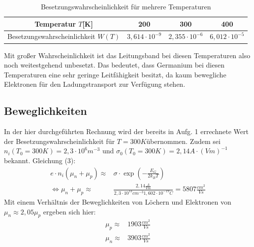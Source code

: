 \begin{table}[H]
\centering
\caption{Besetzungswahrscheinlichkeit für mehrere Temperaturen}
\label{tab:1_1_1}
\begin{tabular}{|c|c|c|c|} \hline
Temperatur \(T\)[K] & 200 & 300 & 400 \\ \hline
Besetzungswahrscheinlichkeit \(W(T)\) &  \(3,614\cdot 10^{-9}\) & \(2,355\cdot 10^{-6}\) & \(6,012\cdot 10^{-5}\) \\ \hline
\end{tabular}
\end{table}
Mit großer Wahrscheinlichkeit ist das Leitungsband bei diesen Temperaturen also noch weitestgehend unbesetzt. Das bedeutet, dass Germanium bei diesen Temperaturen eine sehr geringe Leitfähigkeit besitzt, da kaum bewegliche Elektronen für den Ladungstransport zur Verfügung stehen.

\subsection{Beweglichkeiten}
In der hier durchgeführten Rechnung wird der bereits in Aufg. 1 errechnete Wert der Besetzungswahrscheinlichkeit für \(T=300\si{K}\)übernommen. Zudem sei \(n_i(T_0=300\si{K})=2,3\cdot 10^{6}\si{m^{-3}}\) und \(\sigma_0(T_0=300\si{K})=2,14\si{A\cdot(Vm)^{-1}}\) bekannt. Gleichung (3):
\begin{align*}
e\cdot n_i (\mu_n+\mu_p)\approx & \sigma \cdot \exp(-\frac{E_G}{2 k_B T}) \\
\Leftrightarrow \mu_n+\mu_p \approx & \frac{2,14\si{\frac{A}{V m}}}{2,3\cdot 10^{13}\si{cm^{-3}}1,602\cdot10^{-19}\si{C}} = 5807 \si{\frac{cm^2}{V s}}
\end{align*}
Mit einem Verhältnis der Beweglichkeiten von Löchern und Elektronen von \(\mu_n \approx 2,05 \mu_p\) ergeben sich hier:
\begin{align*}
\mu_p\approx & 1903 \si{\frac{cm^2}{V s}} \\
\mu_n\approx & 3903 \si{\frac{cm^2}{V s}}
\end{align*}


